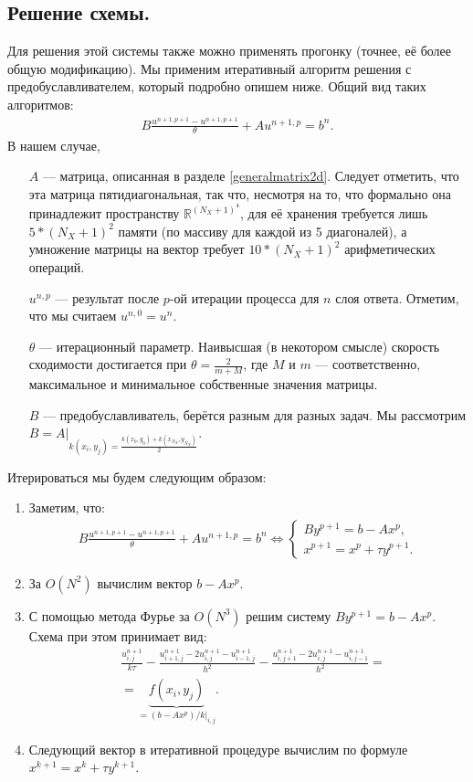 \documentclass[14pt,a4paper]{extarticle}
\newcommand{\1}{\mathbbm{1}}
\newcommand{\R}{\mathbb{R}}
\begin{document}
\subsection{Решение схемы.}
Для решения этой системы также можно применять прогонку (точнее, её более общую модификацию). Мы применим итеративный алгоритм решения с предобуславливателем, который подробно опишем ниже. Общий вид таких алгоритмов:
\begin{align*}
    B \frac{u^{n+1, p+1} - u^{n+1, p+1}}{\theta} + A u^{n+1, p} = b^n.
\end{align*}
В нашем случае, 
\begin{enumerate}
    \item[$A$] --- матрица, описанная в разделе \ref{generalmatrix2d}. Следует отметить, что эта матрица пятидиагональная, так что, несмотря на то, что формально она принадлежит пространству $\R ^{(N_X+1)^4}$, для её хранения требуется лишь $5 * (N_X+1)^2$ памяти (по массиву для каждой из 5 диагоналей), а умножение матрицы на вектор требует $10 * (N_X+1)^2$ арифметических операций.
    \item[$u^{n, p}$] --- результат после $p$-ой итерации процесса для $n$ слоя ответа. Отметим, что мы считаем $u^{n, 0} = u^n$.
    \item[$\theta$] --- итерационный параметр. Наивысшая (в некотором смысле) скорость сходимости достигается при $\theta = \frac{2}{m + M}$, где $M$ и $m$ --- соответственно, максимальное и минимальное собственные значения матрицы. 
    \item[$B$] --- предобуславливатель, берётся разным для разных задач. Мы рассмотрим $B = A \big|_{k(x_i, y_j) = \frac{k(x_0, y_0)+k(x_{N_X}, y_{N_X})}{2}}$.
\end{enumerate}
Итерироваться мы будем следующим образом:
\begin{enumerate}
    \item Заметим, что:
    \begin{align*}
        B \frac{u^{n+1, p+1} - u^{n+1, p+1}}{\theta} + A u^{n+1, p} = b^n\Leftrightarrow 
        \left\{\begin{array}{l}
            B y^{p+1} = b - A x^p, \\
            x^{p+1} = x^p + \tau y^{p+1}.
        \end{array}\right.
    \end{align*}
    \item За $O(N^2)$ вычислим вектор $b - A x^p$.
    \item С помощью метода Фурье за $O(N^3)$ решим систему $B y^{p+1} = b - A x^p$. Схема при этом принимает вид:
\begin{align*}
    &\frac{u^{n+1}_{i,j}}{k \tau} - \frac{u^{n+1}_{i+1, j} - 2 u^{n+1}_{i, j}- u^{n+1}_{i-1, j}}{h^2} -  \frac{u^{n+1}_{i, j+1} - 2 u^{n+1}_{i, j}- u^{n+1}_{i, j-1}}{h^2} =\\&= \underbrace{f(x_i, y_j)}_{= (b-Ax^p)/k\big|_{i,j}}.
\end{align*}

    \item Следующий вектор в итеративной процедуре вычислим по формуле $x^{k+1} = x^k + \tau y^{k+1}$.
\end{enumerate}
\end{document}
